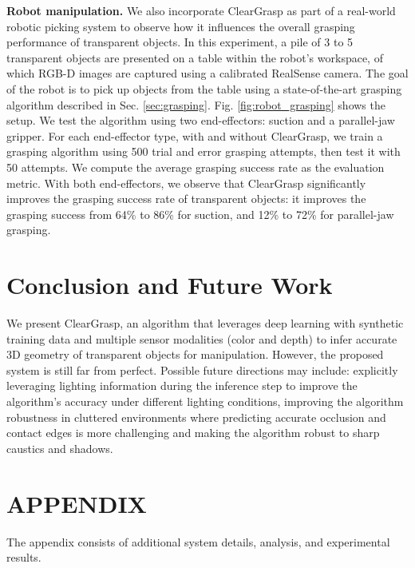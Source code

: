 \documentclass[letterpaper, 10 pt, conference]{ieeeconf}
\newcommand{\myparagraph}[1]{\vspace{0.03in}\noindent\textbf{#1}}
\begin{document}
\myparagraph{Robot manipulation.}
We also incorporate ClearGrasp as part of a real-world robotic picking system to observe how it influences the overall grasping performance of transparent objects. In this experiment, a pile of 3 to 5 transparent objects are presented on a table within the robot's workspace, of which RGB-D images are captured using a calibrated RealSense camera. The goal of the robot is to pick up objects from the table using a state-of-the-art grasping algorithm described in Sec. \ref{sec:grasping}. Fig. \ref{fig:robot_grasping} shows the setup. 
We test the algorithm using two end-effectors: suction and a parallel-jaw gripper. For each end-effector type, with and without ClearGrasp, we train a grasping algorithm using 500 trial and error grasping attempts, then test it with 50 attempts. We compute the average grasping success rate   \cite{zeng2018learning} as the evaluation metric.
With both end-effectors, we observe that ClearGrasp significantly improves the grasping success rate of transparent objects: it improves the grasping success from  64\%  to 86\% for suction, and 12\%  to 72\% for parallel-jaw grasping.



\section{Conclusion and Future Work} 
\label{sec:conclusion}
We present ClearGrasp, an algorithm that leverages deep learning with synthetic training data and multiple sensor modalities (color and depth) to infer accurate 3D geometry of transparent objects for manipulation.
However, the proposed system is still far from perfect. Possible future directions may include: explicitly leveraging lighting information during the inference step to improve the algorithm's accuracy under different lighting conditions, improving the algorithm robustness in cluttered environments where predicting accurate occlusion and contact edges is more challenging and making the algorithm robust to sharp caustics and shadows.



\newpage





\clearpage
\section*{APPENDIX}

The appendix consists of additional system details, analysis, and experimental results.
\end{document}
